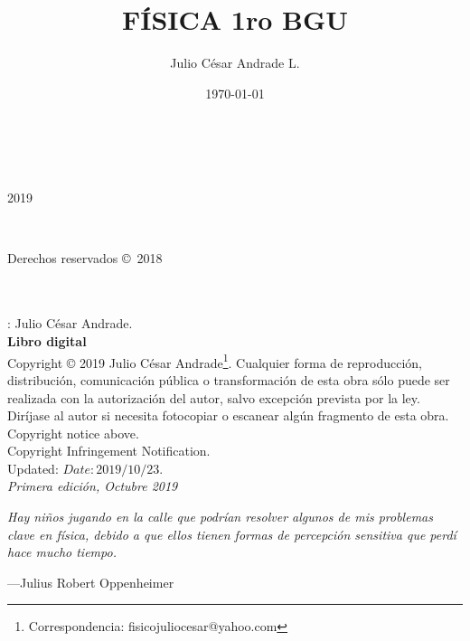 \documentclass[a5paper,pagesize,10pt,bibtotoc,pointlessnumbers,
normalheadings,DIV=9,fleqn,x11names,table,twoside=false]{scrbook}
\title{FÍSICA 1ro BGU}
\author{Julio César Andrade L.}
\date{\today}
\begin{document}
%

\begin{titlepage}
		\\
			
		\vspace{10mm}
		\\
		\vspace{\fill}
		\centering \large{2019}
\end{titlepage}


\newpage
~\vfill
\thispagestyle{empty}

\noindent 
\parbox[s]{0.35\textwidth}{Derechos reservados \copyright\ 2018}\parbox[c]{0.65\textwidth}{
 \color{gray}
 } \\\\  
 
: Julio César Andrade.\\
\noindent \textbf{Libro digital}\\

\noindent  Copyright © 2019 Julio César Andrade\footnote{Correspondencia: fisicojuliocesar@yahoo.com}. 
Cualquier forma de reproducción, distribución, comunicación pública o transformación de esta obra sólo puede ser realizada con  la 
 autorización  del autor,  salvo  excepción  prevista  por  la  ley.  Diríjase  al autor si  necesita  fotocopiar  o  escanear 
algún fragmento de esta obra.\\

Copyright notice above.\\

Copyright Infringement Notification.\\

Updated: $Date: 2019/10/23$.\\

\noindent \textit{Primera edición, Octubre 2019} 


\newpage{}
\thispagestyle {empty}

\vspace*{2cm}

\begin{center}
	\Large{\parbox{10cm}{
		\begin{raggedright}
		{\Large 
			\textit{Hay niños jugando en la calle que podrían resolver algunos de mis problemas clave en física, 
			debido a que ellos tienen formas de percepción sensitiva que perdí hace mucho tiempo.}
		}
	
		\vspace{.5cm}\hfill{---Julius Robert Oppenheimer}
		\end{raggedright}
	}
}
\end{center}
\end{document}
